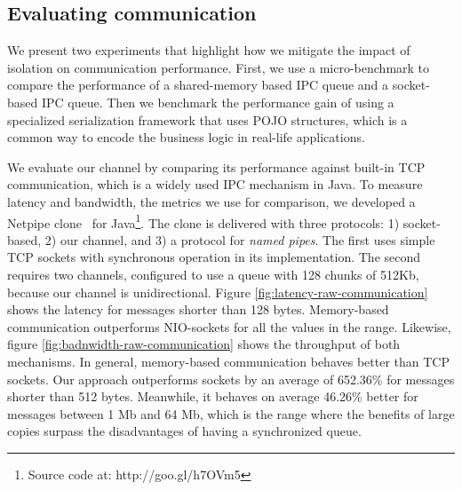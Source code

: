 \subsection{Evaluating communication}
We present two experiments that highlight how we mitigate the impact of isolation on communication performance. %
First, we use a micro-benchmark to compare the performance of a shared-memory based IPC queue and a socket-based IPC queue. %
Then we benchmark the performance gain of using a specialized serialization framework that uses POJO structures, which is a common way to encode the business logic in real-life applications.
   
We evaluate our channel by comparing its performance against built-in TCP communication, which is a widely used IPC mechanism in Java.
To measure latency and bandwidth, the metrics we use for comparison, we developed a Netpipe clone~\cite{Snell96netpipe:a} for Java\footnote{Source code at: http://goo.gl/h7OVm5}.
The clone is delivered with three protocols: 1) socket-based, 2) our channel, and 3) a protocol for \textit{named pipes}.
The first uses simple TCP sockets with synchronous operation in its implementation. 
The second requires two channels, configured to use a queue with 128 chunks of 512Kb, because our channel is unidirectional.
Figure \ref{fig:latency-raw-communication} shows the latency for messages shorter than 128 bytes.
Memory-based communication outperforms NIO-sockets for all the values in the range.
Likewise, figure \ref{fig:badnwidth-raw-communication} shows the throughput of both mechanisms.
In general, memory-based communication behaves better than TCP sockets.
Our approach outperforms sockets by an average of 652.36\% for messages shorter than 512 bytes.
Meanwhile, it behaves on average 46.26\% better for messages between 1 Mb and 64 Mb, which is the range where the benefits of large copies surpass the disadvantages of having a synchronized queue.


